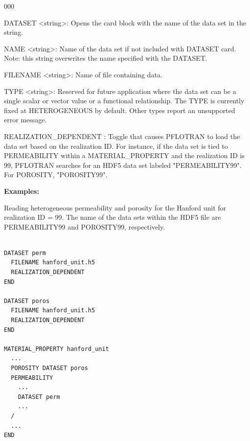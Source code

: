 \documentclass[12pt]{article}
\begin{document}
\begin{deflist}{000}
\item[DATASET] <string>: Opens the card block with the name of the data set in the string.

\item[NAME] <string>: Name of the data set if not included with DATASET card. Note: this string overwrites the name specified with the DATASET.

\item[FILENAME] <string>: Name of file containing data.

\item[TYPE] <string>: Reserved for future application where the data set can be a single scalar or vector value or a functional relationship. The TYPE is currently fixed at HETEROGENEOUS by default. Other types report an unsupported error message.

\item[REALIZATION\_DEPENDENT]: Toggle that causes PFLOTRAN to load the data set based on the realization ID. For instance, if the data set is tied to PERMEABILITY within a MATERIAL\_PROPERTY and the realization ID is 99, PFLOTRAN searches for an HDF5 data set labeled "PERMEABILITY99". For POROSITY, "POROSITY99".

\end{deflist}

\begin{mdframed}

\noindent
{\bf Examples:}

Reading heterogeneous permeability and porosity for the Hanford unit for realization ID = 99. The name of the data sets within the HDF5 file are PERMEABILITY99 and POROSITY99, respectively.

\begin{verbatim}

DATASET perm
  FILENAME hanford_unit.h5
  REALIZATION_DEPENDENT
END

DATASET poros
  FILENAME hanford_unit.h5
  REALIZATION_DEPENDENT
END

MATERIAL_PROPERTY hanford_unit
  ...
  POROSITY DATASET poros
  PERMEABILITY 
    ...
    DATASET perm
    ...
  /
  ...
END
\end{verbatim}

\end{mdframed}

\hyperlink{target_key}{\return}

\end{document}
